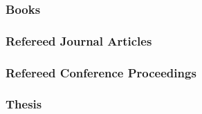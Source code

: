 \subsubsection*{Books}


%

\subsubsection*{Refereed Journal Articles}


%

\subsubsection*{Refereed Conference Proceedings}


%

%

%



%

\subsubsection*{Thesis}


